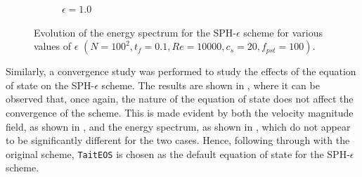 \begin{figure}[htbp!]
\begin{subfigure}{7cm}
  \caption{$\epsilon = 1.0$}
  \end{subfigure}
  \caption{Evolution of the energy spectrum for the SPH-$\epsilon$ scheme for various values of $\epsilon$ $(N=100^2, t_f=0.1, Re=10000, c_s=20, f_{pst}=100)$.}
  \label{fig:sph-eps-meps-espec}
\end{figure}

Similarly, a convergence study was performed to study the effects of the equation of state on the SPH-$\epsilon$ scheme. The results are shown in , where it can be observed that, once again, the nature of the equation of state does not affect the convergence of the scheme.
This is made evident by both the velocity magnitude field, as shown in , and the energy spectrum, as shown in , which do not appear to be significantly different for the two cases. Hence, following through with the original scheme, \texttt{TaitEOS} is chosen as the default equation of state for the SPH-$\epsilon$ scheme.

